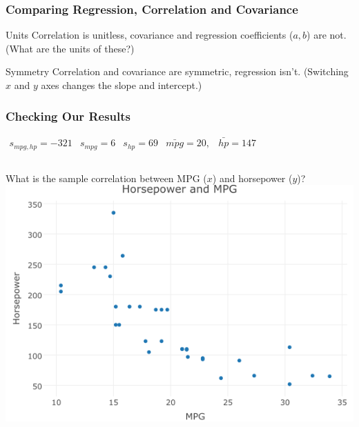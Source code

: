 \documentclass{beamer}
\begin{document}
\begin{frame}
\frametitle{Comparing Regression, Correlation and Covariance}
	\begin{block}{Units}
	Correlation is unitless, covariance and regression coefficients ($a, b$) are not. (What are the 			units of these?)
	\end{block}
	\begin{block}{Symmetry}
	Correlation and covariance are symmetric, regression isn't. (Switching $x$ and $y$ axes changes 		the slope and intercept.)
	\end{block}
\end{frame}

\begin{frame}
\frametitle{Checking Our Results}
	$\begin{array}{ccccc} 
		s_{mpg, hp} = -321 & s_{mpg} = 6 & s_{hp} = 69 & \bar{mpg} = 20,& \bar{hp} = 147
	\end{array}$
	\begin{columns}[c]
		\column{2.5in}
			What is the sample correlation between MPG ($x$) and horsepower ($y$)?
		\column{1.8in}
			\includegraphics[scale = 0.25]{./images/cars.png}
	\end{columns}
\end{frame}
\end{document}
